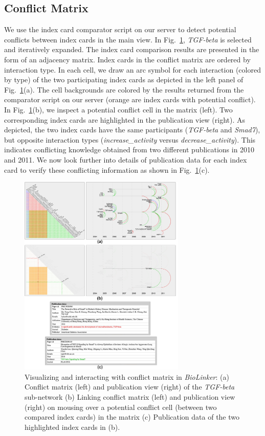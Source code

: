 \documentclass[journal]{vgtc}                %
\newcommand{\theName}{\textit{BioLinker}}
\begin{document}
\subsection{Conflict Matrix}
\label{sec:ConflictMatrix}
We use the index card comparator script on our server to detect potential conflicts between index cards in the main view. In Fig.~\ref{fig:Figure7}, \textit{TGF-beta} is selected and iteratively expanded. The index card comparison results are presented in the form of an adjacency matrix. Index cards in the conflict matrix are ordered by interaction type. In each cell, we draw an arc symbol for each interaction (colored by type) of the two participating index cards as depicted in the left panel of Fig.~\ref{fig:Figure7}(a). The cell backgrounds are colored by the results returned from the comparator script on our server (orange are index cards with potential conflict). In Fig.~\ref{fig:Figure7}(b), we inspect a potential conflict cell in the matrix (left). Two corresponding index cards are highlighted in the publication view (right). As depicted, the two index cards have the same participants (\textit{TGF-beta} and \textit{Smad7}), but opposite interaction types (\textit{increase\_activity} versus \textit{decrease\_activity}). This indicates conflicting knowledge obtained from two different publications in 2010 and 2011. We now look further into details of publication data for each index card to verify these conflicting information as shown in Fig.~\ref{fig:Figure7}(c). 

\begin{figure}[h!]
  \centering
  \includegraphics[width=225pt]{figures/Figure7.png}
  \caption{ Visualizing and interacting with conflict matrix in \theName{}: (a) Conflict matrix (left) and publication view (right) of the \textit{TGF-beta} sub-network (b) Linking conflict matrix (left) and publication view (right) on mousing over a potential conflict cell (between two compared index cards) in the matrix (c) Publication data of the two highlighted index cards in (b).
  }
  \label{fig:Figure7}
\end{figure}
\end{document}
